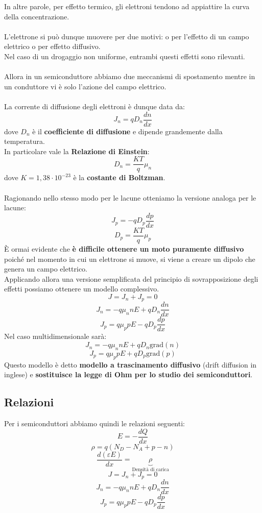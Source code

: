 \documentclass[../main.tex]{subfiles}
\begin{document}
	In altre parole, per effetto termico, gli elettroni tendono ad appiattire la curva della concentrazione.\\\\
	L’elettrone si può dunque muovere per due motivi: o per l’effetto di un campo elettrico o per effetto diffusivo. \\
	Nel caso di un drogaggio non uniforme, entrambi questi effetti sono rilevanti.\\\\
	Allora in un semiconduttore abbiamo due meccanismi di spostamento mentre in un conduttore vi è solo l’azione del campo elettrico.\\\\
	La corrente di diffusione degli elettroni è dunque data da:
	$$J_n = q D_n \frac{dn}{dx}$$
	dove $D_n$ è il \textbf{coefficiente di diffusione} e dipende grandemente dalla temperatura. \\
	In particolare vale la \textbf{Relazione di Einstein}:
	$$D_n = \frac{KT}{q} \mu_n$$
	dove $K = 1,38 \cdot 10^{-23}$ è la \textbf{costante di Boltzman}.\\\\
	Ragionando nello stesso modo per le lacune otteniamo la versione analoga per le lacune:
	$$J_p = -q D_p \frac{dp}{dx}$$
	$$D_p = \frac{KT}{q} \mu_p$$
	È ormai evidente che \textbf{è difficile ottenere un moto puramente diffusivo} poiché nel momento in cui un elettrone si muove, si viene a creare un dipolo che genera un campo elettrico. \\
	Applicando allora una versione semplificata del principio di sovrapposizione degli effetti possiamo ottenere un modello complessivo.
	$$J = J_n + J_p = 0$$
	$$J_n = -q \mu_n n E + q D_n \frac{dn}{dx}$$
	$$J_p = q \mu_p p E - q D_p \frac{dp}{dx}$$
	Nel caso multidimensionale sarà:
	$$J_n = -q \mu_n n E + q D_n \text{grad}(n)$$
	$$J_p = q \mu_p p E + q D_p \text{grad}(p)$$
	Questo modello è detto \textbf{modello a trascinamento diffusivo} (drift diffusion in inglese) e \textbf{sostituisce la legge di Ohm per lo studio dei semiconduttori}.
	\subsection{Relazioni}
	Per i semiconduttori abbiamo quindi le relazioni seguenti:
	$$E = -\frac{dQ}{dx}$$
	$$\rho = q(N_D - N_A + p - n)$$
	$$\frac{d(\varepsilon E)}{dx} = \underbrace{\rho}_{\text{Densità di carica}}$$
	$$J = J_n + J_p = 0$$
	$$J_n = -q\mu_n n E + qD_n \frac{dn}{dx}$$
	$$J_p = q\mu_p p E - qD_p \frac{dp}{dx}$$
\end{document}
